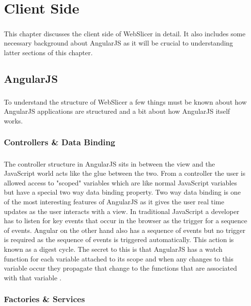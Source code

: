 \chapter{Client Side}
\paragraph{}
This chapter discusses the client side of WebSlicer in detail. 
It also includes some necessary background about AngularJS as it will be crucial to understanding latter sections of this chapter.

\section{AngularJS}
\paragraph{}
To understand the structure of WebSlicer a few things must be known about how AngularJS applications are structured and a bit about how AngularJS itself works.
\subsection{Controllers \& Data Binding}
\paragraph{}
The controller structure in AngularJS sits in between the view and the JavaScript world acts like the glue between the two.
From a controller the user is allowed access to "scoped" variables which are like normal JavaScript variables but have a special two way data binding property.
Two way data binding is one of the most interesting features of AngularJS as it gives the user real time updates as the user interacts with a view.
In traditional JavaScript a developer has to listen for key events that occur in the browser as the trigger for a sequence of events.
Angular on the other hand also has a sequence of events but no trigger is required as the sequence of events is triggered automatically.
This action is known as a digest cycle.
The secret to this is that AngularJS has a watch function for each variable attached to its scope and when any changes to this variable occur they propagate that change to the functions that are associated with that variable \citep{freeman-2014}.

\subsection{Factories \& Services}
